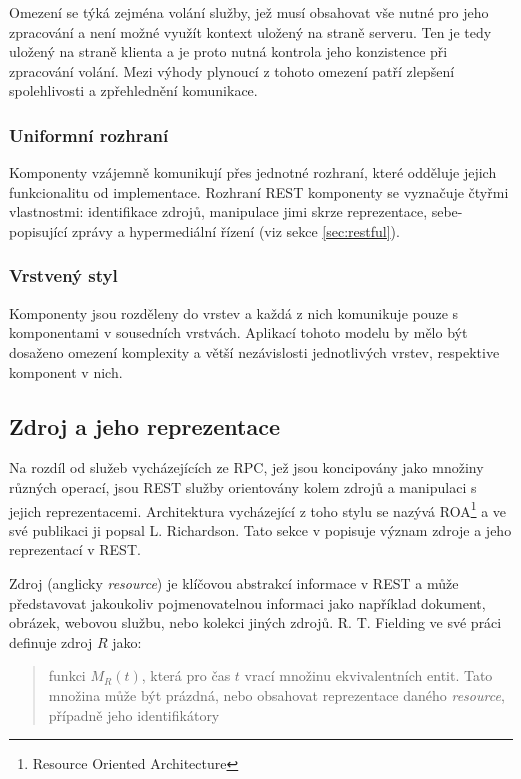 \documentclass[czech,DP]{thesiskiv}
\begin{document}
Omezení se týká zejména volání služby, jež musí obsahovat vše nutné pro jeho zpracování a není možné využít kontext uložený na straně serveru. Ten je tedy uložený na straně klienta a je proto nutná kontrola jeho konzistence při zpracování volání. Mezi výhody plynoucí z tohoto omezení patří zlepšení spolehlivosti a zpřehlednění komunikace.

\subsubsection{Uniformní rozhraní}

Komponenty vzájemně komunikují přes jednotné rozhraní, které odděluje jejich funkcionalitu od implementace. Rozhraní REST komponenty se vyznačuje čtyřmi vlastnostmi: identifikace zdrojů, manipulace jimi skrze reprezentace, sebe-popisující zprávy a hypermediální řízení (viz sekce \ref{sec:restful}).

\subsubsection{Vrstvený styl}
Komponenty jsou rozděleny do vrstev a každá z nich komunikuje pouze s komponentami v sousedních vrstvách. Aplikací tohoto modelu by mělo být dosaženo omezení komplexity a větší nezávislosti jednotlivých vrstev, respektive komponent v nich.

\subsection{Zdroj a jeho reprezentace}
\label{sec:rest-basics}

Na rozdíl od služeb vycházejících ze RPC, jež jsou koncipovány jako množiny různých operací, jsou REST služby orientovány kolem zdrojů a manipulaci s jejich reprezentacemi. Architektura vycházející z toho stylu se nazývá ROA\footnote{Resource Oriented Architecture} a ve své publikaci\cite{restfulWebServices} ji popsal L. Richardson. Tato sekce v popisuje význam zdroje a jeho reprezentací v REST.

Zdroj (anglicky \textit{resource}) je klíčovou abstrakcí informace v REST a může představovat jakoukoliv pojmenovatelnou informaci jako například dokument, obrázek, webovou službu, nebo  kolekci jiných zdrojů. R. T. Fielding ve své práci\cite{fielding2000rest} definuje zdroj $R$ jako: 

\begin{quote}
	funkci $M_R(t)$, která pro čas $t$ vrací množinu ekvivalentních entit. Tato množina může být prázdná, nebo obsahovat reprezentace daného \textit{resource}, případně jeho identifikátory
\end{quote}
\end{document}
